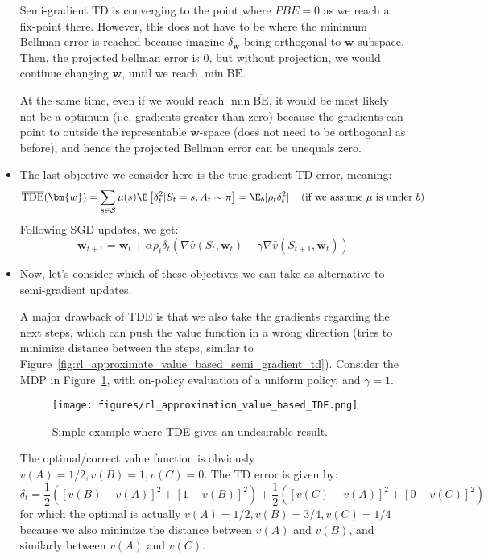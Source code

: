 \begin{itemize}
	Semi-gradient TD is converging to the point where $PBE=0$ as we reach a fix-point there. However, this does not have to be where the minimum Bellman error is reached because imagine $\delta_{\bm{w}}$ being orthogonal to $\bm{w}$-subspace. Then, the projected bellman error is 0, but without projection, we would continue changing $\bm{w}$, until we reach $\min \overline{\text{BE}}$.
	
	At the same time, even if we would reach $\min \overline{\text{BE}}$, it would be most likely not be a optimum (i.e. gradients greater than zero) because the gradients can point to outside the representable $\bm{w}$-space (does not need to be orthogonal as before), and hence the projected Bellman error can be unequals zero.
	
	\item The last objective we consider here is the true-gradient TD error, meaning: $$\overline{\text{TDE}}(\bm{w})=\sum_{s\in\mathcal{S}}\mu(s)\E\left[\delta_t^2 |S_t=s,A_t\sim \pi\right] = \E_{b}[\rho_t \delta_t^2] \hspace{4mm}\text{(if we assume $\mu$ is under $b$)}$$
	Following SGD updates, we get:
	$$\bm{w}_{t+1}=\bm{w}_t + \alpha \rho_t \delta_t (\nabla \hat{v}(S_t,\bm{w}_t) - \gamma \nabla \hat{v}(S_{t+1},\bm{w}_t))$$
	
	\item Now, let's consider which of these objectives we can take as alternative to semi-gradient updates. 
	
	A major drawback of TDE is that we also take the gradients regarding the next steps, which can push the value function in a wrong direction (tries to minimize distance between the steps, similar to Figure~\ref{fig:rl_approximate_value_based_semi_gradient_td}). Consider the MDP in Figure~\ref{fig:rl_approximation_value_based_TDE}, with on-policy evaluation of a uniform policy, and $\gamma=1$.
	
	\begin{figure}[ht!]
		\centering
		\texttt{[image: figures/rl\_approximation\_value\_based\_TDE.png]}
		\caption{Simple example where TDE gives an undesirable result.}
		\label{fig:rl_approximation_value_based_TDE}
	\end{figure}

	The optimal/correct value function is obviously $v(A)=1/2, v(B)=1, v(C)=0$. The TD error is given by:
	$$\delta_t=\frac{1}{2}\left(\left[v(B)-v(A)\right]^2 + \left[1-v(B)\right]^2\right)+\frac{1}{2}\left(\left[v(C)-v(A)\right]^2 + \left[0-v(C)\right]^2\right)$$
	for which the optimal is actually $v(A)=1/2, v(B)=3/4, v(C)=1/4$ because we also minimize the distance between $v(A)$ and $v(B)$, and similarly between $v(A)$ and $v(C)$.
	

\end{itemize}

